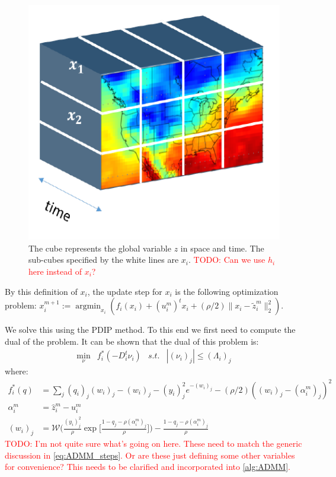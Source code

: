 \documentclass{article}
\DeclareMathOperator*{\argmin}{argmin}
\newcommand{\attn}[1]{\textcolor{red}{TODO: #1}}
\begin{document}
\begin{figure}[tb]
  \centering
  \includegraphics[height=.2\textheight]{Figures/data_cube}
    \caption{The cube represents the global variable $z$ in space and
      time. The sub-cubes specified by the white lines are
      $x_i$. \attn{Can we use $h_i$ here instead of $x_i$?}}
    \label{fig:data_cube}
\end{figure} 


By this definition of $x_i$, the update step for $x_i$ is the
following optimization problem: $x_i^{m+1}:=\argmin_{x_i} ( f_i(x_i) +
(u_i^m)^t x_i + (\rho/2) \lVert x_i-\tilde{z}_i^m \lVert_2^2)$. 

We solve this using the PDIP method. To this end we first need to
compute the dual of the problem. It can be shown that the dual of this
problem is: 
\begin{align}
\min_\nu &f_i^*(-D_i^t\nu_i) & s.t. &| (\nu_i)_j | \le (\Lambda_i)_j
\label{eq:dual_x_update}
\end{align}
 where:
\begin{align}
f^*_i(q)&=\sum_j (q_i)_j (w_i)_j -(w_i)_j-(y_i)_j^2 e^{-(w_i)_j} - 
(\rho/2)((w_i)_j-(\alpha_i^m)_j)^2\\
\alpha_i^m &=\hat{z}_i^m-u_i^m \label{eq:conj_x_update}\\
(w_i)_j&=\mathscr{W}\bigg(\frac{(y_i)_j^2}{\rho}\exp
         \bigg[\frac{1-q_j-\rho(\alpha_i^m)_j}{\rho}\bigg]\bigg)- 
\frac{1-q_j-\rho(\alpha_i^m)_j}{\rho}
\end{align}
\attn{I'm not quite sure what's going on here. These need to match the
  generic discussion in \eqref{eq:ADMM_steps}. Or are these just
  defining some other variables for convenience? This needs to be
  clarified and incorporated into \autoref{alg:ADMM}.}
\end{document}
